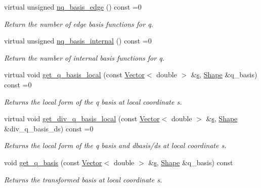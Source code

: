 \begin{DoxyCompactItemize}
virtual unsigned \hyperlink{classoomph_1_1DarcyEquations_a13cbb6dce25734c0d3844466b0435d17}{nq\+\_\+basis\+\_\+edge} () const =0
\begin{DoxyCompactList}\small\item\em Return the number of edge basis functions for q. \end{DoxyCompactList}\item 
virtual unsigned \hyperlink{classoomph_1_1DarcyEquations_ad1836d0919835cd1d5f6af654ca03a52}{nq\+\_\+basis\+\_\+internal} () const =0
\begin{DoxyCompactList}\small\item\em Return the number of internal basis functions for q. \end{DoxyCompactList}\item 
virtual void \hyperlink{classoomph_1_1DarcyEquations_ae4098060d7311ceab8ad7673876f070c}{get\+\_\+q\+\_\+basis\+\_\+local} (const \hyperlink{classoomph_1_1Vector}{Vector}$<$ double $>$ \&\hyperlink{cfortran_8h_ab7123126e4885ef647dd9c6e3807a21c}{s}, \hyperlink{classoomph_1_1Shape}{Shape} \&q\+\_\+basis) const =0
\begin{DoxyCompactList}\small\item\em Returns the local form of the q basis at local coordinate s. \end{DoxyCompactList}\item 
virtual void \hyperlink{classoomph_1_1DarcyEquations_ad1d3676060924184befea1157a0735cd}{get\+\_\+div\+\_\+q\+\_\+basis\+\_\+local} (const \hyperlink{classoomph_1_1Vector}{Vector}$<$ double $>$ \&\hyperlink{cfortran_8h_ab7123126e4885ef647dd9c6e3807a21c}{s}, \hyperlink{classoomph_1_1Shape}{Shape} \&div\+\_\+q\+\_\+basis\+\_\+ds) const =0
\begin{DoxyCompactList}\small\item\em Returns the local form of the q basis and dbasis/ds at local coordinate s. \end{DoxyCompactList}\item 
void \hyperlink{classoomph_1_1DarcyEquations_a4d92638d654ee061508dbd2a6b1c5e95}{get\+\_\+q\+\_\+basis} (const \hyperlink{classoomph_1_1Vector}{Vector}$<$ double $>$ \&\hyperlink{cfortran_8h_ab7123126e4885ef647dd9c6e3807a21c}{s}, \hyperlink{classoomph_1_1Shape}{Shape} \&q\+\_\+basis) const
\begin{DoxyCompactList}\small\item\em Returns the transformed basis at local coordinate s. \end{DoxyCompactList}\item 

\end{DoxyCompactItemize}
